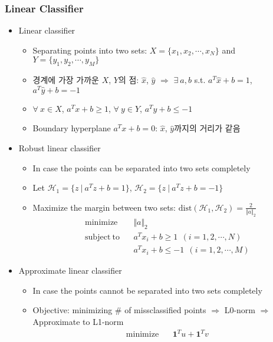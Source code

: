 \subsubsection*{Linear Classifier}
\begin{itemize}
    \item Linear classifier
    \begin{itemize}
        \item Separating points into two sets: $X=\{x_1,x_2,\cdots,x_N\}$ and $Y=\{y_1,y_2,\cdots,y_M\}$
        \item 경계에 가장 가까운 $X$, $Y$의 점: $\hat{x}$, $\hat{y}$ $\Rightarrow$ $\exists~a,b$ s.t. $a^T\hat{x}+b=1$, $a^T\hat{y}+b=-1$
        \item $\forall~x\in X$, $a^Tx+b\geq1$, $\forall~y\in Y$, $a^Ty+b\leq-1$
        \item Boundary hyperplane $a^Tx+b=0$: $\hat{x}$, $\hat{y}$까지의 거리가 같음
    \end{itemize}
    \newpage
    \item Robust linear classifier
    \begin{itemize}
        \item In case the points can be separated into two sets completely
        \item Let $\mathcal{H}_1=\{z~|~a^Tz+b=1\}$, $\mathcal{H}_2=\{z~|~a^Tz+b=-1\}$
        \item Maximize the margin between two sets: $\mathrm{dist}(\mathcal{H}_1,\mathcal{H}_2)=\frac{2}{\Vert a\Vert_2}$
            $$ \begin{aligned}
                \mathrm{minimize}~~&~~\Vert a\Vert_2 \\
                \mathrm{subject~to}~~&~~a^Tx_i+b\geq1~~(i=1,2,\cdots,N) \\
                    &~~a^Tx_i+b\leq-1~~(i=1,2,\cdots,M)
            \end{aligned} $$
    \end{itemize}
    \item Approximate linear classifier
    \begin{itemize}
        \item In case the points cannot be separated into two sets completely
        \item Objective: minimizing \# of missclassified points $\Rightarrow$ L0-norm $\Rightarrow$ Approximate to L1-norm
            $$ \begin{aligned}
                \mathrm{minimize}~~&~~\mathbf{1}^Tu+\mathbf{1}^Tv \\

\end{aligned}$$
\end{itemize}
\end{itemize}
